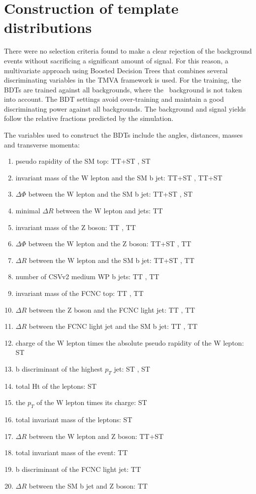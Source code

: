 \section{Construction of template distributions}
There were no selection criteria found to make a clear rejection of the background events without sacrificing a significant amount of signal. For this reason, a multivariate approach using Boosted Decision Trees that combines several discriminating variables in the TMVA framework is used. For the training, the BDTs are trained against all backgrounds, where the \NPL\ background is not taken into account. The BDT settings  avoid over-training and  maintain a good discriminating power against all backgrounds. The background and signal yields follow the relative fractions predicted by the simulation. 


The variables used to construct the BDTs include the angles, distances, masses and transverse momenta:
\begin{enumerate}
	\item pseudo rapidity of the SM top: TT+ST \Zut  , ST \Zct 
	\item invariant mass of the W lepton and the SM b jet: TT+ST \Zut , TT+ST \Zct\ 
	\item $\Delta \Phi$ between the W lepton and the SM b jet: TT+ST \Zut , ST \Zct\ 
	\item minimal $\Delta R$ between the W lepton and jets: TT \Zut 
	\item invariant mass of the Z boson: TT \Zut , TT \Zct\ 
	\item $\Delta \Phi$ between the W lepton and the Z boson: TT+ST \Zut , TT \Zct\ 
	\item $\Delta R$ between the W lepton and the SM b jet: TT+ST \Zut , TT \Zct\ 
	\item  number of CSVv2 medium WP b jets: TT \Zut , TT \Zct\ 
	\item invariant mass of the FCNC top: TT \Zut , TT \Zct\ 
	\item $\Delta R$ between the Z boson and the FCNC light jet: TT \Zut , TT \Zct\ 
	\item $\Delta R$ between the FCNC light jet and the SM b jet: TT \Zut , TT \Zct\ 
	\item charge of the W lepton times the absolute pseudo rapidity of the W lepton: ST \Zut 
	\item b discriminant of the highest $p_T$ jet: ST \Zut , ST \Zct\ 
	\item total Ht of the leptons: ST \Zut 
	\item the $p_T$ of the W lepton times its charge: ST \Zut 
	\item total invariant mass of the leptons: ST \Zct\ 
	\item $\Delta R$ between the W lepton and Z boson: TT+ST \Zct\ 
	\item total invariant mass of the event: TT \Zct\ 
	\item b discriminant of the FCNC light jet: TT \Zct\ 
	\item $\Delta R$ between the SM b jet and Z boson: TT \Zct\ 
\end{enumerate}
